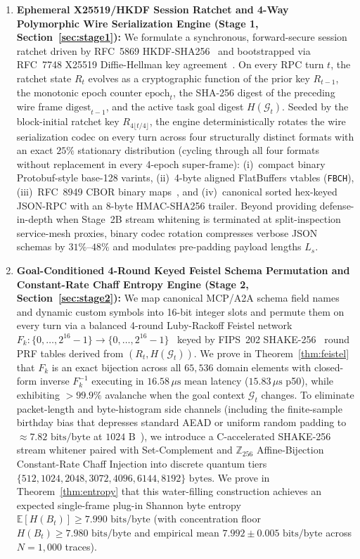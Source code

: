 \documentclass[conference,10pt]{IEEEtran}
\begin{document}
\begin{enumerate}
    \item \textbf{Ephemeral X25519/HKDF Session Ratchet and 4-Way Polymorphic Wire Serialization Engine (Stage 1, Section~\ref{sec:stage1}):} We formulate a synchronous, forward-secure session ratchet driven by RFC~5869 HKDF-SHA256~\cite{krawczyk2010hkdf} and bootstrapped via RFC~7748 X25519 Diffie-Hellman key agreement~\cite{langley2016x25519}. On every RPC turn $t$, the ratchet state $R_t$ evolves as a cryptographic function of the prior key $R_{t-1}$, the monotonic epoch counter $\text{epoch}_t$, the SHA-256 digest of the preceding wire frame $\text{digest}_{t-1}$, and the active task goal digest $H(\mathcal{G}_t)$. Seeded by the block-initial ratchet key $R_{4\lfloor t/4 \rfloor}$, the engine deterministically rotates the wire serialization codec on every turn across four structurally distinct formats with an exact $25\%$ stationary distribution (cycling through all four formats without replacement in every 4-epoch super-frame): (i)~compact binary Protobuf-style base-128 varints, (ii)~4-byte aligned FlatBuffers vtables (\texttt{FBCH}), (iii)~RFC~8949 CBOR binary maps~\cite{bormann2020cbor}, and (iv)~canonical sorted hex-keyed JSON-RPC with an 8-byte HMAC-SHA256 trailer. Beyond providing defense-in-depth when Stage~2B stream whitening is terminated at split-inspection service-mesh proxies, binary codec rotation compresses verbose JSON schemas by $31\%$--$48\%$ and modulates pre-padding payload lengths $L_s$.
    \item \textbf{Goal-Conditioned 4-Round Keyed Feistel Schema Permutation and Constant-Rate Chaff Entropy Engine (Stage 2, Section~\ref{sec:stage2}):} We map canonical MCP/A2A schema field names and dynamic custom symbols into 16-bit integer slots and permute them on every turn via a balanced 4-round Luby-Rackoff Feistel network $F_k: \{0,\dots,2^{16}-1\} \to \{0,\dots,2^{16}-1\}$~\cite{luby1988construct, black2002ciphers, bellare2009format} keyed by FIPS~202 SHAKE-256~\cite{dworkin2015sha3} round PRF tables derived from $(R_t, H(\mathcal{G}_t))$. We prove in Theorem~\ref{thm:feistel} that $F_k$ is an exact bijection across all $65{,}536$ domain elements with closed-form inverse $F_k^{-1}$ executing in $16.58\,\mu\text{s}$ mean latency ($15.83\,\mu\text{s}$ p50), while exhibiting $>99.9\%$ avalanche when the goal context $\mathcal{G}_t$ changes. To eliminate packet-length and byte-histogram side channels (including the finite-sample birthday bias that depresses standard AEAD or uniform random padding to $\approx 7.82\text{ bits/byte}$ at $1024\text{ B}$~\cite{nikitin2019purbs, thomson2024ohttp}), we introduce a C-accelerated SHAKE-256 stream whitener paired with Set-Complement and $\mathbb{Z}_{256}$ Affine-Bijection Constant-Rate Chaff Injection into discrete quantum tiers $\{512, 1024, 2048, 3072, 4096, 6144, 8192\}\text{ bytes}$. We prove in Theorem~\ref{thm:entropy} that this water-filling construction achieves an expected single-frame plug-in Shannon byte entropy $\mathbb{E}[H(B_t)] \ge 7.990\text{ bits/byte}$ (with concentration floor $H(B_t) \ge 7.980\text{ bits/byte}$ and empirical mean $7.992 \pm 0.005\text{ bits/byte}$ across $N = 1{,}000$ traces).

\end{enumerate}
\end{document}
